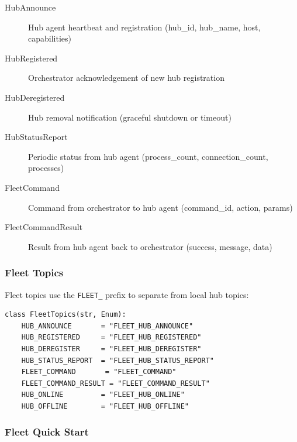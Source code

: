 \begin{description}
   \item[HubAnnounce] Hub agent heartbeat and registration (hub\_id, hub\_name, host, capabilities)
   \item[HubRegistered] Orchestrator acknowledgement of new hub registration
   \item[HubDeregistered] Hub removal notification (graceful shutdown or timeout)
   \item[HubStatusReport] Periodic status from hub agent (process\_count, connection\_count, processes)
   \item[FleetCommand] Command from orchestrator to hub agent (command\_id, action, params)
   \item[FleetCommandResult] Result from hub agent back to orchestrator (success, message, data)
\end{description}

\subsubsection{Fleet Topics}

Fleet topics use the \texttt{FLEET\_} prefix to separate from local hub topics:

\begin{verbatim}
class FleetTopics(str, Enum):
    HUB_ANNOUNCE       = "FLEET_HUB_ANNOUNCE"
    HUB_REGISTERED     = "FLEET_HUB_REGISTERED"
    HUB_DEREGISTER     = "FLEET_HUB_DEREGISTER"
    HUB_STATUS_REPORT  = "FLEET_HUB_STATUS_REPORT"
    FLEET_COMMAND       = "FLEET_COMMAND"
    FLEET_COMMAND_RESULT = "FLEET_COMMAND_RESULT"
    HUB_ONLINE         = "FLEET_HUB_ONLINE"
    HUB_OFFLINE        = "FLEET_HUB_OFFLINE"
\end{verbatim}

\subsubsection{Fleet Quick Start}

